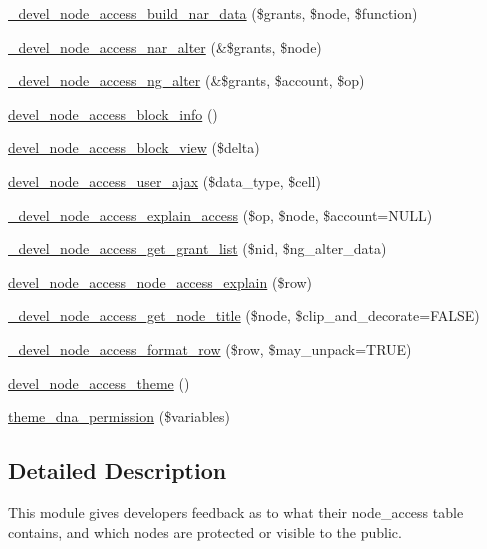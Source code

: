 \begin{DoxyCompactItemize}
\item 
\hyperlink{devel__node__access_8module_ac95e8f567bfc44a460680bd2d676faaa}{\_\-devel\_\-node\_\-access\_\-build\_\-nar\_\-data} (\$grants, \$node, \$function)
\item 
\hyperlink{devel__node__access_8module_a4e53f1761aae77265e0b5fecfef17875}{\_\-devel\_\-node\_\-access\_\-nar\_\-alter} (\&\$grants, \$node)
\item 
\hyperlink{devel__node__access_8module_a00d150a03a2dfbbe199be12f0c49f738}{\_\-devel\_\-node\_\-access\_\-ng\_\-alter} (\&\$grants, \$account, \$op)
\item 
\hyperlink{devel__node__access_8module_a2e24b01fdced9c434e1b8471835db857}{devel\_\-node\_\-access\_\-block\_\-info} ()
\item 
\hyperlink{devel__node__access_8module_a0394c90f9987f4c074827f8bb366e3d0}{devel\_\-node\_\-access\_\-block\_\-view} (\$delta)
\item 
\hyperlink{devel__node__access_8module_a961a9a76d97dc0c7e505a39545dcdd72}{devel\_\-node\_\-access\_\-user\_\-ajax} (\$data\_\-type, \$cell)
\item 
\hyperlink{devel__node__access_8module_a4cb1e534842f4b1976d02c7cd0f9958d}{\_\-devel\_\-node\_\-access\_\-explain\_\-access} (\$op, \$node, \$account=NULL)
\item 
\hyperlink{devel__node__access_8module_a58e0c4afd1e983169bad627bcdfc9b89}{\_\-devel\_\-node\_\-access\_\-get\_\-grant\_\-list} (\$nid, \$ng\_\-alter\_\-data)
\item 
\hyperlink{devel__node__access_8module_a7b594d5b01b220abc354695853569809}{devel\_\-node\_\-access\_\-node\_\-access\_\-explain} (\$row)
\item 
\hyperlink{devel__node__access_8module_aae8673d182a87acb3b8039decbe5fb4f}{\_\-devel\_\-node\_\-access\_\-get\_\-node\_\-title} (\$node, \$clip\_\-and\_\-decorate=FALSE)
\item 
\hyperlink{devel__node__access_8module_acd34231a07364b267c722f6335eb4a3f}{\_\-devel\_\-node\_\-access\_\-format\_\-row} (\$row, \$may\_\-unpack=TRUE)
\item 
\hyperlink{devel__node__access_8module_a0bc44f963481619ef0dabc255aa3a850}{devel\_\-node\_\-access\_\-theme} ()
\item 
\hyperlink{devel__node__access_8module_a9a1d86356d3e21f44fd2bc73a915b329}{theme\_\-dna\_\-permission} (\$variables)
\end{DoxyCompactItemize}


\subsection{Detailed Description}
This module gives developers feedback as to what their node\_\-access table contains, and which nodes are protected or visible to the public. 

